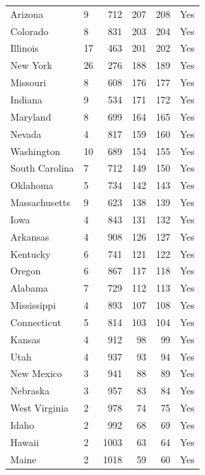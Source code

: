 \begin{longtable}{llrrrc}
Arizona                 & 9  &  712 & 207 & 208 & Yes \\
Colorado                & 8  &  831 & 203 & 204 & Yes \\
Illinois                & 17 &  463 & 201 & 202 & Yes \\
New York                & 26 &  276 & 188 & 189 & Yes \\
Missouri                & 8  &  608 & 176 & 177 & Yes \\
Indiana                 & 9  &  534 & 171 & 172 & Yes \\
Maryland                & 8  &  699 & 164 & 165 & Yes \\
Nevada                  & 4  &  817 & 159 & 160 & Yes \\
Washington              & 10 &  689 & 154 & 155 & Yes \\
South Carolina          & 7  &  712 & 149 & 150 & Yes \\
Oklahoma                & 5  &  734 & 142 & 143 & Yes \\
Massachusetts           & 9  &  623 & 138 & 139 & Yes \\
Iowa                    & 4  &  843 & 131 & 132 & Yes \\
Arkansas                & 4  &  908 & 126 & 127 & Yes \\
Kentucky                & 6  &  741 & 121 & 122 & Yes \\
Oregon                  & 6  &  867 & 117 & 118 & Yes \\
Alabama                 & 7  &  729 & 112 & 113 & Yes \\
Mississippi             & 4  &  893 & 107 & 108 & Yes \\
Connecticut             & 5  &  814 & 103 & 104 & Yes \\
Kansas                  & 4  &  912 &  98 &  99 & Yes \\
Utah                    & 4  &  937 &  93 &  94 & Yes \\
New Mexico              & 3  &  941 &  88 &  89 & Yes \\
Nebraska\est{}          & 3  &  957 &  83 &  84 & Yes \\
West Virginia           & 2  &  978 &  74 &  75 & Yes \\
Idaho                   & 2  &  992 &  68 &  69 & Yes \\
Hawaii                  & 2  & 1003 &  63 &  64 & Yes \\
Maine                   & 2  & 1018 &  59 &  60 & Yes \\

\end{longtable}
